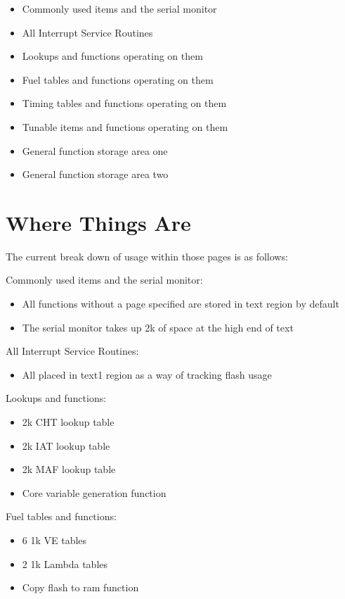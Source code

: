 \documentclass[12pt,a4wide,titlepage]{article}
\begin{document}
\begin{titlepage}
\begin{center}
\begin{itemize}
\item Commonly used items and the serial monitor
\item All Interrupt Service Routines
\item Lookups and functions operating on them
\item Fuel tables and functions operating on them
\item Timing tables and functions operating on them
\item Tunable items and functions operating on them
\item General function storage area one
\item General function storage area two
\end{itemize}




\section{Where Things Are}

The current break down of usage within those pages is as follows:

Commonly used items and the serial monitor:

\begin{itemize}
\item All functions without a page specified are stored in text region by default
\item The serial monitor takes up 2k of space at the high end of text
\end{itemize}

All Interrupt Service Routines:

\begin{itemize}
\item All placed in text1 region as a way of tracking flash usage
\end{itemize}


Lookups and functions:

\begin{itemize}
\item 2k CHT lookup table
\item 2k IAT lookup table
\item 2k MAF lookup table
\item Core variable generation function
\end{itemize}


Fuel tables and functions:

\begin{itemize}
\item 6 1k VE tables
\item 2 1k Lambda tables
\item Copy flash to ram function
\end{itemize}



\end{center}
\end{titlepage}
\end{document}
